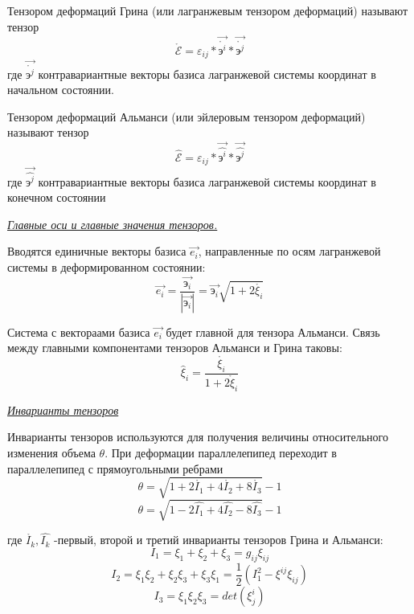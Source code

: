 Тензором деформаций Грина (или лагранжевым тензором деформаций) называют тензор $$\mathring{\mathcal{E}}=\varepsilon_{ij}*\overrightarrow{\mathring{\text{э}^i}}*\overrightarrow{\mathring{\text{э}^j}}$$ где $\overrightarrow{\mathring{\text{э}^j}}$ контравариантные векторы базиса лагранжевой системы координат в начальном состоянии. 

Тензором деформаций Альманси (или эйлеровым тензором деформаций) называют тензор $$\hat{\mathcal{E}}=\varepsilon_{ij}*\overrightarrow{\hat{\text{э}^i}}*\overrightarrow{\hat{\text{э}^j}}$$ где $\overrightarrow{\hat{\text{э}^j}}$ контравариантные векторы базиса лагранжевой системы координат в конечном состоянии


\begin{center}
	\textit{\underline{Главные оси и главные значения тензоров.}}
\end{center}

Вводятся единичные векторы базиса $\overrightarrow{e_i}$, направленные по осям лагранжевой системы в деформированном состоянии:
$$\overrightarrow{e_i}=\frac{\overrightarrow{\text{э}_{i}}}{|\overrightarrow{\text{э}_{i}}|}=\overrightarrow{\text{э}_{i}}\sqrt{1+2\mathring{\xi_i}}$$

Система с вектораами базиса $\overrightarrow{e_i}$ будет главной для тензора Альманси. 
Связь между главными компонентами тензоров Альманси и Грина таковы:
$$\hat\xi_i=\frac{\mathring{\xi_i}}{1+2\mathring\xi_i}$$

\begin{center}
	\textit{\underline{Инварианты тензоров}}
\end{center}
Инварианты тензоров используются для получения величины относительного изменения объема $\theta$.
При деформации параллелепипед переходит в параллелепипед с прямоугольными ребрами 
$$\theta=\sqrt{1+2\mathring{I_1}+4\mathring{I_2}+8\mathring{I_3}}-1$$
$$\theta=\sqrt{1-2\hat{I_1}+4\hat{I_2}-8\hat{I_3}}-1$$

где $\mathring{I_k},\hat{I_k}$ -первый, второй и третий инварианты тензоров Грина и Альманси:
$$I_1=\xi_1+\xi_2+\xi_3=g_{ij}\xi_{ij}$$
$$I_2=\xi_1\xi_2+\xi_2\xi_3+\xi_3\xi_1=\frac{1}{2}(I_1^2-\xi^{ij}\xi_{ij})$$
$$I_3=\xi_1\xi_2\xi_3=det(\xi_j^i)$$
